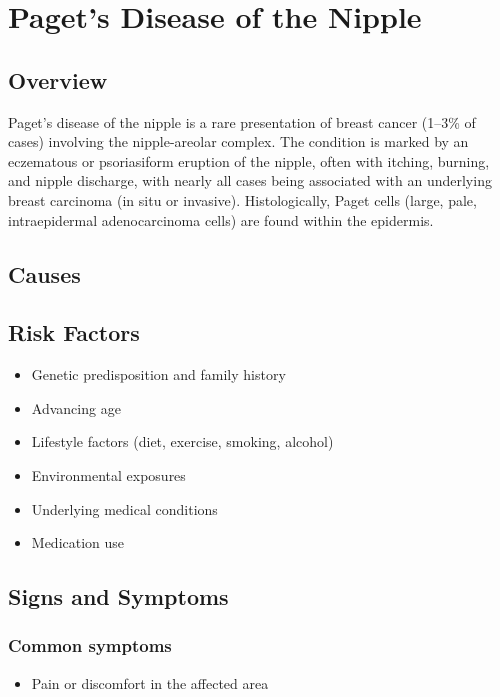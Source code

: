 \chapter{Paget's Disease of the Nipple}
\label{sec:Paget's Disease of the Nipple}

\section{Overview}
Paget's disease of the nipple is a rare presentation of breast cancer (1--3\% of cases) involving the nipple-areolar complex. The condition is marked by an eczematous or psoriasiform eruption of the nipple, often with itching, burning, and nipple discharge, with nearly all cases being associated with an underlying breast carcinoma (in situ or invasive). Histologically, Paget cells (large, pale, intraepidermal adenocarcinoma cells) are found within the epidermis.
\section{Causes}
\section{Risk Factors}

\begin{itemize}[noitemsep]
  \item Genetic predisposition and family history
  \item Advancing age
  \item Lifestyle factors (diet, exercise, smoking, alcohol)
  \item Environmental exposures
  \item Underlying medical conditions
  \item Medication use
\end{itemize}
\section{Signs and Symptoms}

\subsection{Common symptoms}
\begin{itemize}[noitemsep]
  \item Pain or discomfort in the affected area
  \end{itemize}

